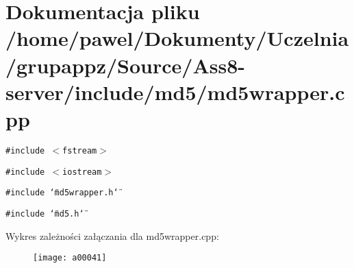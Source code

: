 \hypertarget{a00011}{
\section{Dokumentacja pliku /home/pawel/Dokumenty/Uczelnia/grupappz/Source/Ass8-server/include/md5/md5wrapper.cpp}
\label{a00011}
}
{\tt \#include $<$fstream$>$}\par
{\tt \#include $<$iostream$>$}\par
{\tt \#include \char`\"{}md5wrapper.h\char`\"{}}\par
{\tt \#include \char`\"{}md5.h\char`\"{}}\par


Wykres zależności załączania dla md5wrapper.cpp:\nopagebreak
\begin{figure}[H]
\begin{center}
\leavevmode
\texttt{[image: a00041]}
\end{center}
\end{figure}
